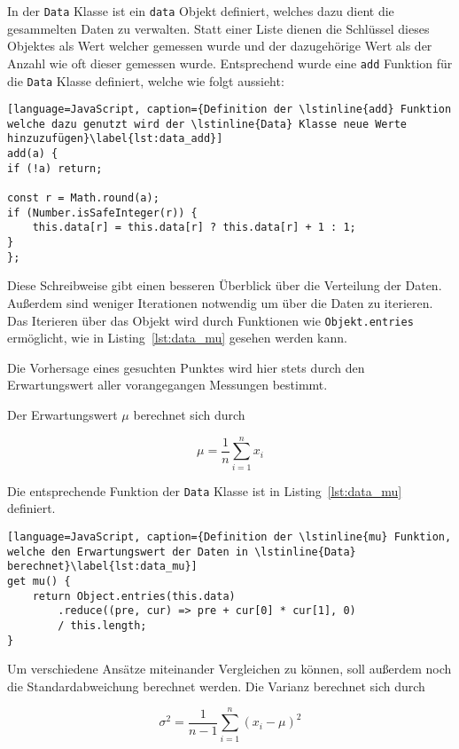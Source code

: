 In der \lstinline{Data} Klasse ist ein \lstinline{data} Objekt definiert, welches dazu dient die gesammelten Daten zu verwalten.
Statt einer Liste dienen die Schlüssel dieses Objektes als Wert welcher gemessen wurde und der dazugehörige Wert als der Anzahl wie oft dieser gemessen wurde.
Entsprechend wurde eine \lstinline{add} Funktion für die \lstinline{Data} Klasse definiert, welche wie folgt aussieht:

\begin{lstlisting}[language=JavaScript, caption={Definition der \lstinline{add} Funktion welche dazu genutzt wird der \lstinline{Data} Klasse neue Werte hinzuzufügen}\label{lst:data_add}]
add(a) {
if (!a) return;

const r = Math.round(a);
if (Number.isSafeInteger(r)) {
    this.data[r] = this.data[r] ? this.data[r] + 1 : 1;
}
};
\end{lstlisting}

Diese Schreibweise gibt einen besseren Überblick über die Verteilung der Daten.
Außerdem sind weniger Iterationen notwendig um über die Daten zu iterieren.
Das Iterieren über das Objekt wird durch Funktionen wie \lstinline{Objekt.entries} ermöglicht, wie in Listing~\ref{lst:data_mu} gesehen werden kann.

Die Vorhersage eines gesuchten Punktes wird hier stets durch den Erwartungswert aller vorangegangen Messungen bestimmt.

Der Erwartungswert $\mu$ berechnet sich durch

\begin{equation}
    \mu = \frac{1}{n} \sum_{i=1}^n{x_i}
\end{equation}

Die entsprechende Funktion der \lstinline{Data} Klasse ist in Listing~\ref{lst:data_mu} definiert.

\begin{lstlisting}[language=JavaScript, caption={Definition der \lstinline{mu} Funktion, welche den Erwartungswert der Daten in \lstinline{Data} berechnet}\label{lst:data_mu}]
get mu() {
    return Object.entries(this.data)
        .reduce((pre, cur) => pre + cur[0] * cur[1], 0)
        / this.length;
}
\end{lstlisting}

Um verschiedene Ansätze miteinander Vergleichen zu können, soll außerdem noch die Standardabweichung berechnet werden.
Die Varianz berechnet sich durch

\begin{equation}
    \sigma^2 = \frac{1}{n - 1} \sum_{i=1}^n(x_i - \mu)^2
\end{equation}

